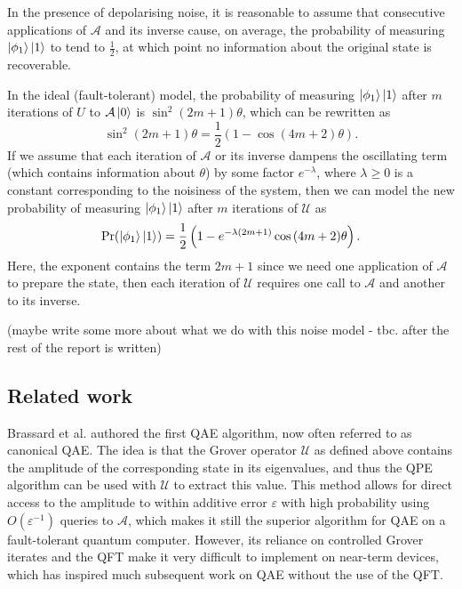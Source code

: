 In the presence of depolarising noise, it is reasonable to assume that consecutive applications of $\mathcal{A}$ and its inverse cause, on average, the probability of measuring $\ket{\phi_1}\ket{1}$ to tend to $\frac{1}{2}$, at which point no information about the original state is recoverable.

In the ideal (fault-tolerant) model, the probability of measuring $\ket{\phi_1} \ket{1}$ after $m$ iterations of $U$ to $\mathcal{A} \ket{0}$ is $\sin^2{(2m+1) \theta }$, which can be rewritten as
\[
\sin^2{(2m+1) \theta } = \frac{1}{2} \left( 1 - \cos{ (4m+2) \theta } \right).
\]
If we assume that each iteration of $\mathcal{A}$ or its inverse dampens the oscillating term (which contains information about $\theta$) by some factor $e^{-\lambda}$, where $\lambda \geq 0$ is a constant corresponding to the noisiness of the system, then we can model the new probability of measuring $\ket{\phi_1}\ket{1}$ after $m$ iterations of $\mathcal{U}$ as
\[
\Pr(\ket{\phi_1} \ket{1}) = \frac{1}{2} \left( 1 - e^{- \lambda (2m+1)} \cos{ (4m+2) \theta } \right).
\]
Here, the exponent contains the term $2m+1$ since we need one application of $\mathcal{A}$ to prepare the state, then each iteration of $\mathcal{U}$ requires one call to $\mathcal{A}$ and another to its inverse.

{\color{purple} (maybe write some more about what we do with this noise model - tbc. after the rest of the report is written)}

\subsection{Related work}
Brassard et al. \cite{brassard_2002_q_amp_amp} authored the first QAE algorithm, now often referred to as canonical QAE. The idea is that the Grover operator $\mathcal{U}$ as defined above contains the amplitude of the corresponding state in its eigenvalues, and thus the QPE algorithm can be used with $\mathcal{U}$ to extract this value. This method allows for direct access to the amplitude to within additive error $\varepsilon$ with high probability using $O(\varepsilon^{-1})$ queries to $\mathcal{A}$, which makes it still the superior algorithm for QAE on a fault-tolerant quantum computer. However, its reliance on controlled Grover iterates and the QFT make it very difficult to implement on near-term devices, which has inspired much subsequent work on QAE without the use of the QFT.

